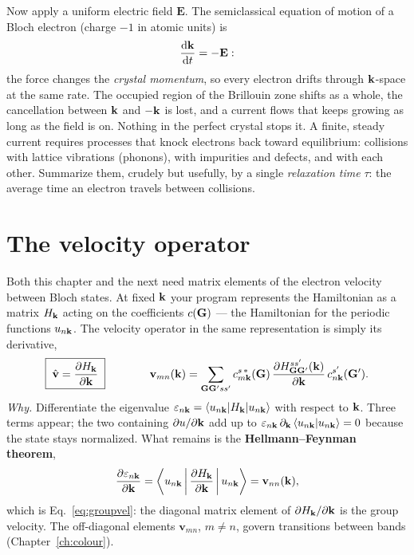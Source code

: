 Now apply a uniform electric field $\mathbf E$. The semiclassical equation
of motion of a Bloch electron (charge $-1$ in atomic units) is
\begin{equation}
\frac{\mathrm{d}\mathbf{k}}{\mathrm{d} t} = -\mathbf E :
\end{equation}
the force changes the \emph{crystal momentum}, so every electron drifts
through $\mathbf{k}$-space at the same rate. The occupied region of the Brillouin
zone shifts as a whole, the cancellation between $\mathbf{k}$ and $-\mathbf{k}$ is lost,
and a current flows that keeps growing as long as the field is on. Nothing
in the perfect crystal stops it. A finite, steady current requires
processes that knock electrons back toward equilibrium: collisions with
lattice vibrations (phonons), with impurities and defects, and with each
other. Summarize them, crudely but usefully, by a single \emph{relaxation
time} $\tau$: the average time an electron travels between collisions.

\section{The velocity operator}
\label{sec:velocity}

Both this chapter and the next need matrix elements of the electron
velocity between Bloch states. At fixed $\mathbf{k}$ your program represents the
Hamiltonian as a matrix $H_{\mathbf{k}}$ acting on the coefficients $c(\mathbf{G})$ ---
the Hamiltonian for the periodic functions $u_{n\mathbf{k}}$. The velocity
operator in the same representation is simply its derivative,
\begin{equation}
\boxed{\;\hat{\mathbf v} = \frac{\partial H_{\mathbf{k}}}{\partial \mathbf{k}}\;}
\qquad\qquad
\mathbf v_{mn}(\mathbf{k}) = \sum_{\mathbf{G}\mathbf{G}' ss'} c^{s\,*}_{m\mathbf{k}}(\mathbf{G})\,
\frac{\partial H^{ss'}_{\mathbf{G}\mathbf{G}'}(\mathbf{k})}{\partial \mathbf{k}}\, c^{s'}_{n\mathbf{k}}(\mathbf{G}') .
\label{eq:velop}
\end{equation}
\emph{Why.} Differentiate the eigenvalue $\varepsilon_{n\mathbf{k}} =
\braket{u_{n\mathbf{k}}|H_{\mathbf{k}}|u_{n\mathbf{k}}}$ with respect to $\mathbf{k}$. Three terms
appear; the two containing $\partial u/\partial\mathbf{k}$ add up to
$\varepsilon_{n\mathbf{k}}\,\partial_{\mathbf{k}}\braket{u_{n\mathbf{k}}|u_{n\mathbf{k}}} = 0$ because
the state stays normalized. What remains is the
\textbf{Hellmann--Feynman theorem},
\begin{equation}
\frac{\partial \varepsilon_{n\mathbf{k}}}{\partial \mathbf{k}} = \Braket{u_{n\mathbf{k}}|\frac{\partial H_{\mathbf{k}}}{\partial \mathbf{k}}|u_{n\mathbf{k}}}
= \mathbf v_{nn}(\mathbf{k}),
\label{eq:hf}
\end{equation}
which is Eq.~\eqref{eq:groupvel}: the diagonal matrix element of
$\partial H_{\mathbf{k}}/\partial\mathbf{k}$ is the group velocity. The off-diagonal
elements $\mathbf v_{mn}$, $m\ne n$, govern transitions between bands
(Chapter~\ref{ch:colour}).

